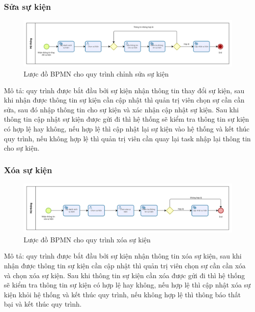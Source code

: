 \subsubsection{Sửa sự kiện}

\begin{figure}[!htp]
    \centering
    \includegraphics[width=14cm]{img/BPMN/event/edit_event.png}
    \newline
    \caption{Lược đồ BPMN cho quy trình chỉnh sửa sự kiện}
\end{figure}
Mô tả: quy trình được bắt đầu bởi sự kiện nhận thông tin thay đổi sự kiện, sau khi nhận được thông tin sự kiện cần cập nhật thì quản trị viên chọn sự cần cần sửa, sau đó nhập thông tin cho sự kiện và xác nhận cập nhật sự kiện. Sau khi thông tin cập nhật sự kiện được gửi đi thì hệ thống sẽ kiểm tra thông tin sự kiện có hợp lệ hay không, nếu hợp lệ thì cập nhật lại sự kiện vào hệ thống và kết thúc quy trình, nếu không hợp lệ thì quản trị viên cần quay lại task nhập lại thông tin cho sự kiện.

\subsubsection{Xóa sự kiện}

\begin{figure}[!htp]
    \centering
    \includegraphics[width=14cm]{img/BPMN/event/delete_event.png}
    \newline
    \caption{Lược đồ BPMN cho quy trình xóa sự kiện}
\end{figure}
Mô tả: quy trình được bắt đầu bởi sự kiện nhận thông tin xóa sự kiện, sau khi nhận được thông tin sự kiện cần cập nhật thì quản trị viên chọn sự cần cần xóa và chọn xóa sự kiện. Sau khi thông tin sự kiện cần xóa được gửi đi thì hệ thống sẽ kiểm tra thông tin sự kiện có hợp lệ hay không, nếu hợp lệ thì cập nhật xóa sự kiện khỏi hệ thống và kết thúc quy trình, nếu không hợp lệ thì thông báo thất bại và kết thúc quy trình.

